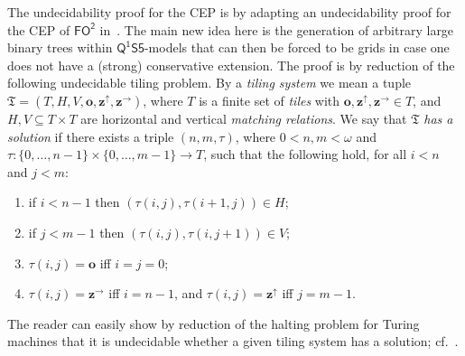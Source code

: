 \documentclass[10pt,a4paper]{amsart}
\theoremstyle{plain}
\theoremstyle{definition}
\newcommand{\nb}[1]{\textcolor{red}{\bf!}%
	\marginpar[\parbox{15mm}{\raggedleft\scriptsize\textcolor{red}{#1}}]%
	{\parbox{15mm}{\raggedright\scriptsize\textcolor{red}{#1}}}}
\newcommand{\tiling}{\mathfrak T}
\newcommand{\bbvarup}{\Zvar^\uparrow}
\newcommand{\bbvarright}{\Zvar^\to}
\newcommand{\FOT}{\ensuremath{\mathsf{FO^2}}}
\newcommand{\FOMS}{\ensuremath{\mathsf{Q^1S5}}}
\newcommand{\fform}[1]{\boldsymbol{#1}}
\newcommand{\ovar}{\fform{o}}
\newcommand{\Zvar}{\fform{z}}
\begin{document}
The undecidability proof for the CEP is by adapting an undecidability proof for the CEP of \FOT{} in~\cite{DBLP:conf/icalp/JungLM0W17}. The main new idea here is the generation of arbitrary large binary trees  within \FOMS{}-models that can then be forced to be grids in case one does not have a (strong) conservative extension. The proof is by reduction of the following undecidable tiling problem.	By a \emph{tiling system} we mean a tuple $\tiling=(T,H,V,\ovar,\bbvarup,\bbvarright)$, where
$T$ is a finite set of \emph{tiles} with 
$\ovar,\bbvarup,\bbvarright\in T$, and $H,V\subseteq T\times T$ are 	
horizontal and vertical \emph{matching relations\/}. 
We say that $\tiling$ \emph{has a solution} if there exists a triple
$(n,m,\tau)$, where $0<n,m < \omega$ and $\tau \colon \{0,\dots,n-1\}
\times \{0,\ldots,m-1\} \rightarrow T$, such that the following hold, for all 
$i< n$ and $j<m$:		
%
\begin{enumerate}[style=multiline,leftmargin=0.9cm]
	\item[\textbf{(t1)}] if $i<n-1$ then $(\tau(i,j),\tau(i+1,j)) \in H$;
	
	\item[\textbf{(t2)}] if $j<m-1$ then $(\tau(i,j),\tau(i,j+1)) \in V$;
	
	\item[\textbf{(t3)}] $\tau(i,j)=\ovar$ iff $i=j=0$;
	
	\item[\textbf{(t4)}] $\tau(i,j) = \bbvarright$ iff $i=n-1$, and $\tau(i,j) = \bbvarup$ iff $j=m-1$.
\end{enumerate}
%	
The reader can easily show by reduction of the halting problem for Turing machines that it is undecidable whether a given tiling system has a solution; cf.~\cite{EmdeBoas97}.
\end{document}
